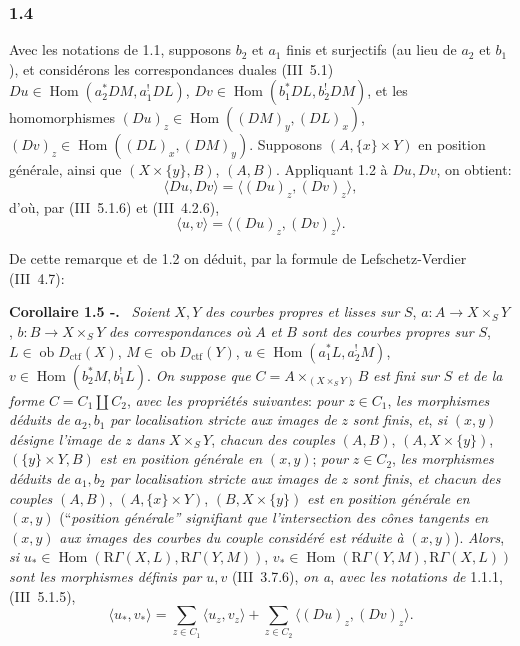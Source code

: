 \documentclass[11pt]{article}
\newenvironment{statement}[1]{\par\medskip\noindent\textbf{#1.}\ }{\par\medskip}
\DeclareMathOperator{\Hom}{Hom}
\newcommand{\R}{\mathrm{R}}\newcommand{\RHomCore}{\mathrm{RHom}}
\newcommand{\ob}{\operatorname{ob}}
\providecommand{\ctf}{\mathrm{ctf}}
\providecommand{\Hom}{\operatorname{Hom}}
\providecommand{\ob}{\operatorname{ob}}
\providecommand{\R}{\mathrm R}
\providecommand{\Hom}{\operatorname{Hom}}
\begin{document}
\subsubsection*{1.4}
Avec les notations de 1.1, supposons $b_2$ et $a_1$ finis et surjectifs (au lieu de $a_2$ et $b_1$), et considérons les correspondances duales (III~5.1) $Du\in\Hom(a_2^*DM,a_1^!DL)$, $Dv\in\Hom(b_1^*DL,b_2^!DM)$, et les homomorphismes $(Du)_z\in\Hom((DM)_y,(DL)_x)$, $(Dv)_z\in\Hom((DL)_x,(DM)_y)$. Supposons $(A,\{x\}\times Y)$ en position générale, ainsi que $(X\times\{y\},B)$, $(A,B)$. Appliquant 1.2 à $Du,Dv$, on obtient:
\[
\langle Du,Dv\rangle=\langle (Du)_z,(Dv)_z\rangle,
\]
d'où, par (III~5.1.6) et (III~4.2.6),
\begin{equation}\tag{1.4.1}
\langle u,v\rangle=\langle (Du)_z,(Dv)_z\rangle.
\end{equation}

De
cette remarque et de 1.2 on déduit, par la formule de Lefschetz-Verdier (III~4.7):

\begin{statement}{Corollaire 1.5 -}
\emph{Soient} $X,Y$ \emph{des courbes propres et lisses sur} $S$, $a:A\longrightarrow X\times_S Y$, $b:B\longrightarrow X\times_S Y$ \emph{des correspondances où} $A$ \emph{et} $B$ \emph{sont des courbes propres sur} $S$, $L\in\ob D_{\ctf}(X)$, $M\in\ob D_{\ctf}(Y)$, $u\in\Hom(a_1^*L,a_2^!M)$, $v\in\Hom(b_2^*M,b_1^!L)$. \emph{On suppose que} $C=A\times_{(X\times_S Y)}B$ \emph{est fini sur} $S$ \emph{et de la forme} $C=C_1\amalg C_2$, \emph{avec les propriétés suivantes}: \emph{pour} $z\in C_1$, \emph{les morphismes déduits de} $a_2,b_1$ \emph{par localisation stricte aux images de} $z$ \emph{sont finis}, \emph{et}, \emph{si} $(x,y)$ \emph{désigne l'image de} $z$ \emph{dans} $X\times_S Y$, \emph{chacun des couples} $(A,B)$, $(A,X\times\{y\})$, $(\{y\}\times Y,B)$ \emph{est en position générale en} $(x,y)$; \emph{pour} $z\in C_2$, \emph{les morphismes déduits de} $a_1,b_2$ \emph{par localisation stricte aux images de} $z$ \emph{sont finis}, \emph{et chacun des couples} $(A,B)$, $(A,\{x\}\times Y)$, $(B,X\times\{y\})$ \emph{est en position générale en} $(x,y)$ (``\emph{position générale'' signifiant que l'intersection des cônes tangents en} $(x,y)$ \emph{aux images des courbes du couple considéré est réduite à} $(x,y)$). \emph{Alors}, \emph{si} $u_*\in\Hom(\R\Gamma(X,L),\R\Gamma(Y,M))$, $v_*\in\Hom(\R\Gamma(Y,M),\R\Gamma(X,L))$ \emph{sont les morphismes définis par} $u,v$ (III~3.7.6), \emph{on a}, \emph{avec les notations de} 1.1.1, (III~5.1.5),
\begin{equation}\tag{1.5.1}
\langle u_*,v_*\rangle=\sum_{z\in C_1}\langle u_z,v_z\rangle+\sum_{z\in C_2}\langle (Du)_z,(Dv)_z\rangle.
\end{equation}
\end{statement}
\end{document}
